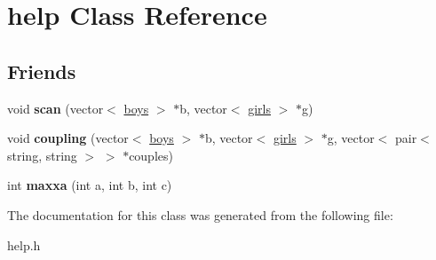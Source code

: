 \hypertarget{classhelp}{}\section{help Class Reference}
\label{classhelp}
\subsection*{Friends}
\begin{DoxyCompactItemize}
\item 
void {\bfseries scan} (vector$<$ \hyperlink{classboys}{boys} $>$ $\ast$b, vector$<$ \hyperlink{classgirls}{girls} $>$ $\ast$g)\hypertarget{classhelp_a1bd6609980e19efb535bf00ba3ec30c8}{}\label{classhelp_a1bd6609980e19efb535bf00ba3ec30c8}

\item 
void {\bfseries coupling} (vector$<$ \hyperlink{classboys}{boys} $>$ $\ast$b, vector$<$ \hyperlink{classgirls}{girls} $>$ $\ast$g, vector$<$ pair$<$ string, string $>$ $>$ $\ast$couples)\hypertarget{classhelp_a178b62f150719a3ced27127f10f3d5f7}{}\label{classhelp_a178b62f150719a3ced27127f10f3d5f7}

\item 
int {\bfseries maxxa} (int a, int b, int c)\hypertarget{classhelp_afc4053d1bfe41df964f62c2590e67948}{}\label{classhelp_afc4053d1bfe41df964f62c2590e67948}

\end{DoxyCompactItemize}


The documentation for this class was generated from the following file\+:\begin{DoxyCompactItemize}
\item 
help.\+h\end{DoxyCompactItemize}

